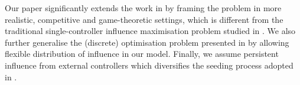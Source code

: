  
 Our paper significantly extends the work in \cite{li2013influence} by framing the problem in more realistic, competitive and game-theoretic settings, which is different from the traditional single-controller influence maximisation problem studied in \cite{li2013influence}. We also further generalise the (discrete) optimisation problem presented in \cite{li2013influence} by allowing flexible distribution of influence in our model. Finally, we assume persistent influence from external controllers which diversifies the seeding process adopted in \cite{li2013influence}.